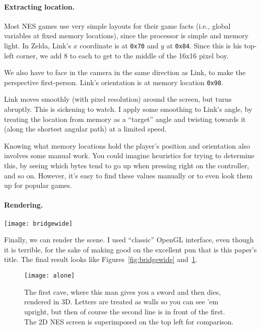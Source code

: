 \documentclass[twocolumn]{article}
\begin{document}
\paragraph{Extracting location.}

Most NES games use very simple layouts for their game facts (i.e.,
global variables at fixed memory locations), since the processor is
simple and memory light.\cite{murphy2013first} In Zelda, Link's
$x$ coordinate is at \verb+0x70+ and $y$ at \verb+0x84+. Since this
is his top-left corner, we add 8 to each to get to the middle of the
16x16 pixel boy.

We also have to face in the camera in the same direction as Link, to
make the perspective first-person. Link's orientation is at memory
location \verb+0x98+.

Link moves smoothly (with pixel resolution) around the screen, but
turns abruptly. This is sickening to watch. I apply some smoothing to
Link's angle, by treating the location from memory as a ``target''
angle and twisting towards it (along the shortest angular path) at a
limited speed.

Knowing what memory locations hold the player's position and
orientation also involves some manual work. You could imagine
heuristics for trying to determine this, by seeing which bytes tend to
go up when pressing right on the controller, and so on. However, it's
easy to find these values manually or to even look them up for popular
games.

\paragraph{Rendering.}

\begin{figure*}[t]
\begin{center}
\texttt{[image: bridgewide]}
\end{center}\vspace{-0.1in}
\caption{A representative view of the Legend of Zelda in glorious
  3D.} \label{fig:bridgewide}
\end{figure*}


Finally, we can render the scene. I used ``classic'' OpenGL interface,
even though it is terrible, for the sake of making good on the
excellent pun that is this paper's title. The final result looks like
Figures~\ref{fig:bridgewide} and~\ref{fig:alone}.

\begin{figure}[ht]
\begin{center}
\texttt{[image: alone]}
\end{center}\vspace{-0.1in}
\caption{The first cave, where this man gives you a sword and then dies,
rendered in 3D. Letters are treated as walls so you can see 'em upright,
but then of course the second line is in front of the first. The 2D NES
screen is superimposed on the top left for comparison.
} \label{fig:alone}
\end{figure}
\end{document}
